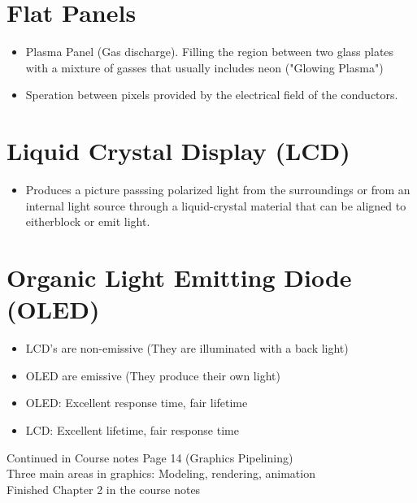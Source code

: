 \documentclass[12pt]{article}
\begin{document}
	\section*{Flat Panels}
	\begin{itemize}
		\item Plasma Panel (Gas discharge). Filling the region between two glass plates with a mixture of gasses that usually includes neon ("Glowing Plasma")
		\item Speration between pixels provided by the electrical field of the conductors.
	\end{itemize}

	\section*{Liquid Crystal Display (LCD)}
	\begin{itemize}
		\item Produces a picture passsing polarized light from the surroundings or from an internal light source through a liquid-crystal material that can be aligned to eitherblock or emit light.
	\end{itemize}

	\section*{Organic Light Emitting Diode (OLED)}
	\begin{itemize}
		\item LCD's are non-emissive (They are illuminated with a back light)
		\item OLED are emissive (They produce their own light)
		\item OLED: Excellent response time, fair lifetime
		\item LCD: Excellent lifetime, fair response time
	\end{itemize}

	Continued in Course notes Page 14 (Graphics Pipelining)\\
	
	Three main areas in graphics: Modeling, rendering, animation\\
	Finished Chapter 2 in the course notes\\
	
\end{document}
